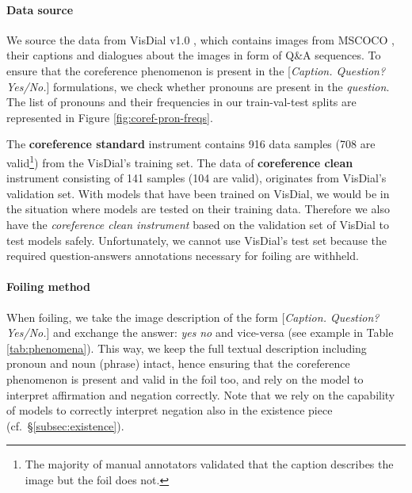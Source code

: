 \documentclass[11pt]{article}
\begin{document}
\paragraph{Data source}
We source the data from VisDial v1.0 \cite{visdial}, which contains images from MSCOCO \cite{Lin-etal:2014:mscoco}, their captions and dialogues about the images in form of Q\&A sequences.
To ensure that the coreference phenomenon is present in the [\emph{Caption. Question? Yes/No.}] formulations, we check whether pronouns are present in the \emph{question}. The list of pronouns and their frequencies in our train-val-test splits are represented in Figure \ref{fig:coref-pron-freqs}.

The \textbf{coreference standard} instrument contains 916 data samples (708 are valid\footnote{The majority of manual annotators validated that the caption describes the image but the foil does not.}) from the VisDial's training set. The data of \textbf{coreference clean} instrument consisting of 141 samples (104 are valid), originates from VisDial's validation set. With models that have been trained on VisDial, we would be in the situation where models are tested on their training data. Therefore we also have the \emph{coreference clean instrument} based on the validation set of VisDial to test models safely. Unfortunately, we cannot use VisDial's test set because the required question-answers annotations necessary for foiling are withheld.

\paragraph{Foiling method}
When foiling, we take the image description of the form [\emph{Caption. Question? Yes/No.}] and exchange the answer: \emph{yes} \textrightarrow \emph{no} and vice-versa (see example in Table \ref{tab:phenomena}). This way, we keep the full textual description including pronoun and noun (phrase) intact, hence ensuring that the coreference phenomenon is present and valid in the foil too, and rely on the model to interpret affirmation and negation correctly. Note that we rely on the capability of models to correctly interpret negation also in the existence piece (cf.\ \S \ref{subsec:existence}).
\end{document}
